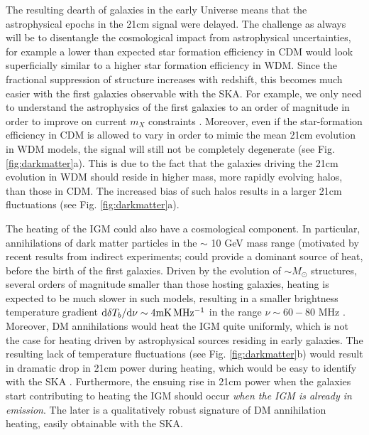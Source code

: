\documentclass{PoS}
\newcommand{\ud}{{\rm d}}
\begin{document}
The resulting dearth of galaxies in the early Universe means that the astrophysical epochs in the 21cm signal were delayed.  The challenge as always will be to disentangle the cosmological impact from astrophysical uncertainties, for example a lower than expected star formation efficiency in CDM would look superficially similar to a higher star formation efficiency in WDM.  Since the fractional suppression of structure increases with redshift, this becomes much easier with the first galaxies observable with the SKA.  For example, we only need to understand the astrophysics of the first galaxies to an order of magnitude in order to improve on current $m_X$ constraints \citep{2014MNRAS.438.2664S}.
Moreover, even if the star-formation efficiency in CDM is allowed to vary in order to mimic the mean 21cm evolution in WDM models, the signal will still not be completely degenerate (see Fig. \ref{fig:darkmatter}a).  This is due to the fact that the galaxies driving the 21cm evolution in WDM should reside in higher mass, more rapidly evolving halos, than those in CDM.  The increased bias of such halos results in a larger 21cm fluctuations (see Fig. \ref{fig:darkmatter}a).

The heating of the IGM could also have a cosmological component.  In particular, annihilations of dark matter particles in the $\sim$ 10 GeV mass range (motivated by recent results from indirect experiments; \cite[e.g.][]{2009Natur.458..607A, 2010JCAP...04..014A,2013PhRvL.110n1102A}
could provide a dominant source of heat, before the birth of the first galaxies.  Driven by the evolution of $\sim M_\odot$ structures, several orders of magnitude smaller than those hosting galaxies, heating is expected to be much slower in such models, resulting in a smaller brightness temperature gradient  $\ud\delta T_b/\ud\nu \sim4 {\rm mK\, MHz^{-1}}$ in the range $\nu \sim 60 - 80$ MHz \citep{2013MNRAS.429.1705V}.  Moreover, DM annihilations would heat the IGM quite uniformly, which is not the case for heating driven by astrophysical sources residing in early galaxies.  The resulting lack of temperature fluctuations (see Fig. \ref{fig:darkmatter}b) would result in dramatic drop in 21cm power during heating, which would be easy to identify with the SKA \citep{2014arXiv1408.1109E}.  Furthermore, the ensuing rise in 21cm power when the galaxies start contributing to heating the IGM should occur {\em when the IGM is already in emission}.  The later is a qualitatively robust signature of DM annihilation heating, easily obtainable with the SKA.
\end{document}
